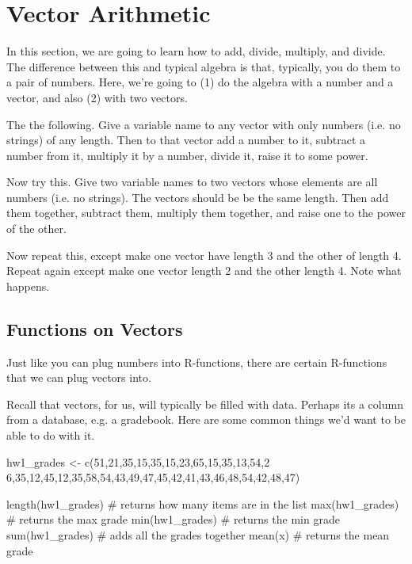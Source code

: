 \section{Vector Arithmetic}

In this section, we are going to learn how to add, divide, multiply, and divide. The difference between this and typical algebra is that, typically, you do them to a pair of numbers.  Here, we're going to (1) do the algebra with a number and a vector, and also (2) with two vectors.
  
The the following. Give a variable name to any vector with only
numbers (i.e. no strings) of any length.  Then to that vector add a
number to it, subtract a number from it, multiply it by a number,
divide it, raise it to some power.


Now try this. Give two variable names to two vectors whose elements
are all numbers (i.e. no strings). The vectors should be be the same
length. Then add them together, subtract them, multiply them together,
and raise one to the power of the other.

Now repeat this, except make one vector have length 3 and the other of
length 4. Repeat again except make one vector length 2 and the other
length 4.  Note what happens.

\subsection{Functions on Vectors}

Just like you can plug numbers into R-functions, there are certain
R-functions that we can plug vectors into.
  
Recall that vectors, for us, will typically be filled with data. Perhaps its a column from a database, e.g. a gradebook. Here are some common things we'd want to be able to do with it.
  
\begin{example}
  \begin{rcode}
    hw1_grades <-  c(51,21,35,15,35,15,23,65,15,35,13,54,2
    6,35,12,45,12,35,58,54,43,49,47,45,42,41,43,46,48,54,42,48,47)
    
    length(hw1_grades) # returns how many items are in the list
    max(hw1_grades) # returns the max grade
    min(hw1_grades) # returns the min grade
    sum(hw1_grades) # adds all the grades together
    mean(x) # returns the mean grade
  \end{rcode}
\end{example}
  
